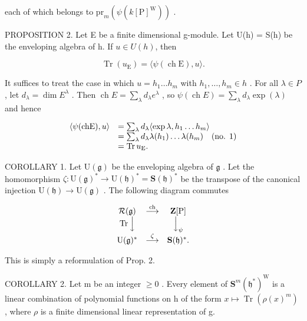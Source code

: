 each of which belongs to \(\mathrm{pr}_m(\psi (k[\mathrm{P}]^{\mathrm{W}}))\) .

PROPOSITION 2. Let E be a finite dimensional g-module. Let U(h) = S(h) be the enveloping algebra of h. If \(u \in U(h)\), then

\[
\operatorname{Tr} (u _ {\mathrm{E}}) = \langle \psi (\operatorname{ch} \mathrm{E}), u \rangle .
\]

It suffices to treat the case in which \(u = h_{1} \ldots h_{m}\) with \(h_{1}, \ldots, h_{m} \in h\) . For all \(\lambda \in P\) , let \(d_{\lambda} = \dim E^{\lambda}\) . Then \(\operatorname{ch} E = \sum_{\lambda} d_{\lambda} e^{\lambda}\) , so \(\psi(\operatorname{ch} E) = \sum_{\lambda} d_{\lambda} \exp(\lambda)\) and hence

\[
\begin{array}{r l} \langle \psi (\mathrm{chE}), u \rangle & = \sum_ {\lambda} d _ {\lambda} \langle \exp \lambda , h _ {1} \dots h _ {m} \rangle \\ & = \sum_ {\lambda} d _ {\lambda} \lambda (h _ {1}) \dots \lambda (h _ {m}) \quad (\text {no. 1}) \\ & = \operatorname{Tr} u _ {\mathrm{E}}. \end{array}
\]

COROLLARY 1. Let \(\mathrm{U}(\mathfrak{g})\) be the enveloping algebra of \(\mathfrak{g}\) . Let the homomorphism \(\zeta : \mathrm{U}(\mathfrak{g})^* \to \mathrm{U}(\mathfrak{h})^* = \mathbf{S}(\mathfrak{h})^*\) be the transpose of the canonical injection \(\mathrm{U}(\mathfrak{h}) \to \mathrm{U}(\mathfrak{g})\) . The following diagram commutes

\[
\begin{array}{c c c} \mathcal {R} (\mathfrak {g}) & \stackrel {{\text {ch}}} {{\longrightarrow}} & \mathbf {Z} [ \mathrm{P} ] \\ \operatorname{Tr} \Big \downarrow & & \Big \downarrow_ {\psi} \\ \mathrm{U} (\mathfrak {g}) ^ {*} & \stackrel {{\zeta}} {{\longrightarrow}} & \mathbf {S} (\mathfrak {h}) ^ {*}. \end{array}
\]

This is simply a reformulation of Prop. 2.

COROLLARY 2. Let m be an integer \(\geq 0\) . Every element of \(\mathbf{S}^{m}(\mathfrak{h}^{*})^{\mathrm{W}}\) is a linear combination of polynomial functions on h of the form \(x \mapsto \operatorname{Tr}(\rho(x)^{m})\) , where \(\rho\) is a finite dimensional linear representation of g.

